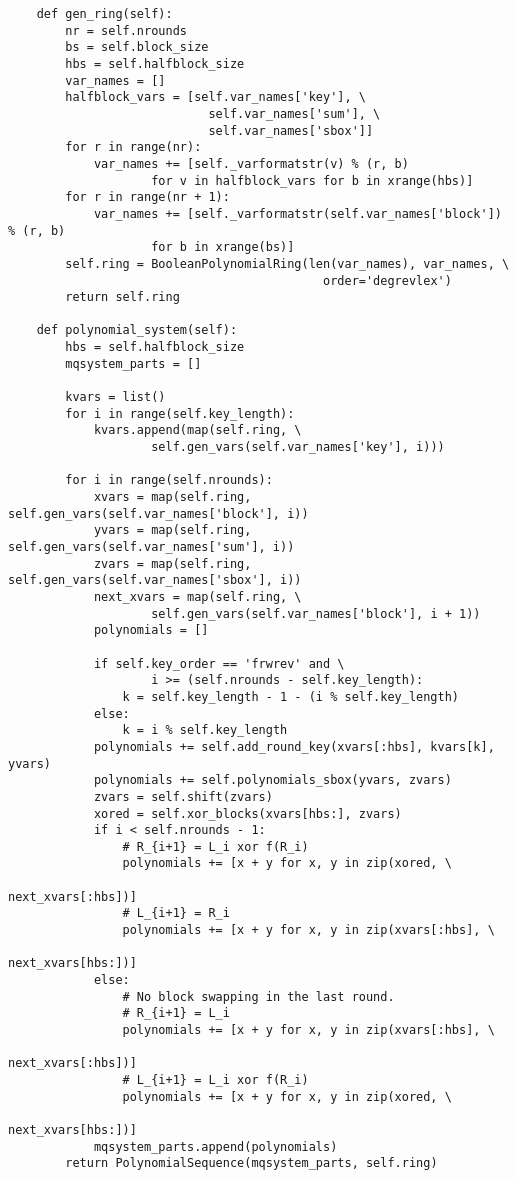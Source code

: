 \begin{appendices}
\begin{lstlisting}
    def gen_ring(self):
        nr = self.nrounds
        bs = self.block_size
        hbs = self.halfblock_size
        var_names = []
        halfblock_vars = [self.var_names['key'], \
                            self.var_names['sum'], \
                            self.var_names['sbox']]
        for r in range(nr):
            var_names += [self._varformatstr(v) % (r, b) 
                    for v in halfblock_vars for b in xrange(hbs)]
        for r in range(nr + 1):
            var_names += [self._varformatstr(self.var_names['block']) % (r, b) 
                    for b in xrange(bs)]
        self.ring = BooleanPolynomialRing(len(var_names), var_names, \
                                            order='degrevlex') 
        return self.ring

    def polynomial_system(self):
        hbs = self.halfblock_size
        mqsystem_parts = []

        kvars = list()
        for i in range(self.key_length):
            kvars.append(map(self.ring, \
                    self.gen_vars(self.var_names['key'], i)))

        for i in range(self.nrounds):
            xvars = map(self.ring, self.gen_vars(self.var_names['block'], i))
            yvars = map(self.ring, self.gen_vars(self.var_names['sum'], i))
            zvars = map(self.ring, self.gen_vars(self.var_names['sbox'], i))
            next_xvars = map(self.ring, \
                    self.gen_vars(self.var_names['block'], i + 1))
            polynomials = []
            
            if self.key_order == 'frwrev' and \
                    i >= (self.nrounds - self.key_length):
                k = self.key_length - 1 - (i % self.key_length)
            else:
                k = i % self.key_length
            polynomials += self.add_round_key(xvars[:hbs], kvars[k], yvars)
            polynomials += self.polynomials_sbox(yvars, zvars)
            zvars = self.shift(zvars)
            xored = self.xor_blocks(xvars[hbs:], zvars)
            if i < self.nrounds - 1:
                # R_{i+1} = L_i xor f(R_i)
                polynomials += [x + y for x, y in zip(xored, \
                                                        next_xvars[:hbs])]
                # L_{i+1} = R_i
                polynomials += [x + y for x, y in zip(xvars[:hbs], \
                                                        next_xvars[hbs:])]
            else:
                # No block swapping in the last round.
                # R_{i+1} = L_i
                polynomials += [x + y for x, y in zip(xvars[:hbs], \
                                                        next_xvars[:hbs])]
                # L_{i+1} = L_i xor f(R_i)
                polynomials += [x + y for x, y in zip(xored, \
                                                        next_xvars[hbs:])]
            mqsystem_parts.append(polynomials)
        return PolynomialSequence(mqsystem_parts, self.ring)


\end{lstlisting}
\end{appendices}
